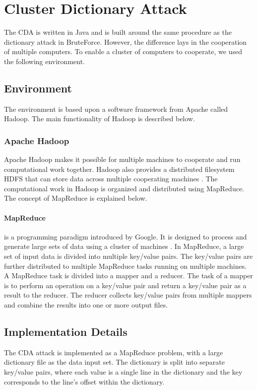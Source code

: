 \documentclass[pdftex,english,10pt,b5paper,twoside]{book}
\begin{document}
\section{Cluster Dictionary Attack}
The CDA is written in Java and is built around the same procedure as the
dictionary attack in BruteForce. However, the difference lays in the cooperation
of multiple computers. To enable a cluster of computers to cooperate, we used
the following environment.

\subsection{Environment}
The environment is based upon a software framework from Apache called Hadoop. The
main functionality of Hadoop is described below.

\subsubsection{Apache Hadoop}
Apache Hadoop makes it possible for multiple machines to cooperate
and run computational work together. Hadoop also provides a distributed filesystem
\ac{HDFS} that can store data across multiple cooperating machines \cite{hadoop}. The
computational work in Hadoop is organized and distributed using MapReduce.
The concept of MapReduce is explained below.

\paragraph{MapReduce} is a programming paradigm introduced by Google. It is designed to
process and generate large sets of data using a cluster of machines \cite{mapred}.
In MapReduce, a large set of input data is divided into multiple key/value
pairs. The key/value pairs are further distributed to multiple MapReduce tasks
running on multiple machines. A MapReduce task is divided into
a mapper and a reducer. The task of a mapper is to perform an operation on a
key/value pair and return a key/value pair as a result to the reducer. The
reducer collects key/value pairs from multiple mappers and combine the results
into one or more output files.

\subsection{Implementation Details} 
The CDA attack is implemented as a MapReduce problem, with a large dictionary
file as the data input set. The dictionary is split into separate
key/value pairs, where each value is a single line in the dictionary and the key
corresponds to the line's offset within the dictionary.\\ 
\end{document}
